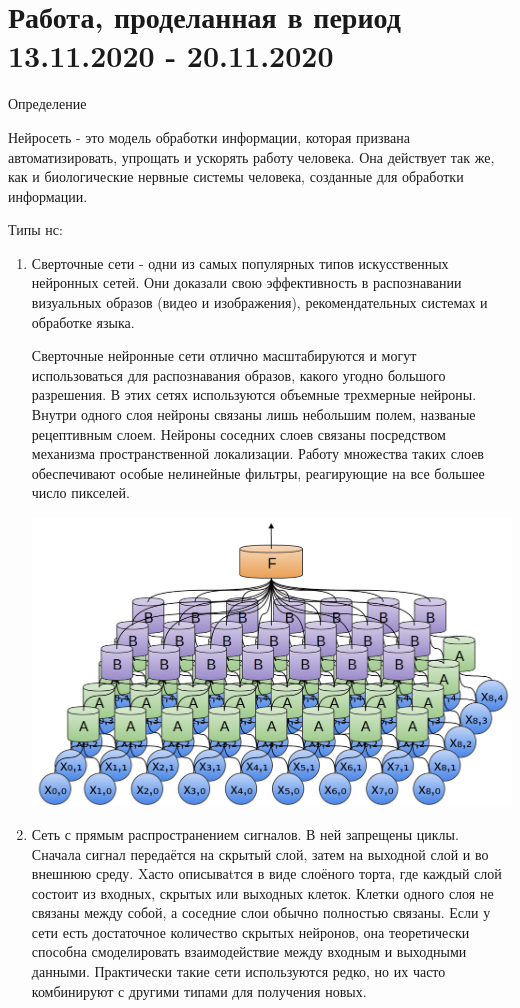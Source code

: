 \documentclass[12pt,a4paper]{report}
\begin{document}
	\section{Работа, проделанная в период 13.11.2020 - 20.11.2020}
	Определение 

Нейросеть  - это модель обработки информации, которая призвана автоматизировать, упрощать и ускорять работу человека. Она действует так же, как и биологические нервные системы человека, созданные для обработки информации. 

 Типы нс: 

\begin{enumerate}
\item Сверточные сети - одни из самых популярных типов искусственных нейронных сетей. Они доказали свою эффективность в распознавании визуальных образов (видео и изображения), рекомендательных системах и обработке языка.

Сверточные нейронные сети отлично масштабируются и могут использоваться для распознавания образов, какого угодно большого разрешения.
В этих сетях используются объемные трехмерные нейроны. Внутри одного слоя нейроны связаны лишь небольшим полем, названые рецептивным слоем.
Нейроны соседних слоев связаны посредством механизма пространственной локализации. Работу множества таких слоев обеспечивают особые нелинейные фильтры, реагирующие на все большее число пикселей.

\includegraphics{sv}

\item Сеть с прямым распространением сигналов. В ней запрещены циклы. Сначала сигнал передаётся на скрытый слой, затем на выходной слой и во внешнюю среду. Xасто описываtтся в виде слоёного торта, где каждый слой состоит из входных, скрытых или выходных клеток. Клетки одного слоя не связаны между собой, а соседние слои обычно полностью связаны. Если у сети есть достаточное количество скрытых нейронов, она теоретически способна смоделировать взаимодействие между входным и выходными данными. Практически такие сети используются редко, но их часто комбинируют с другими типами для получения новых.


\end{enumerate}
\end{document}
